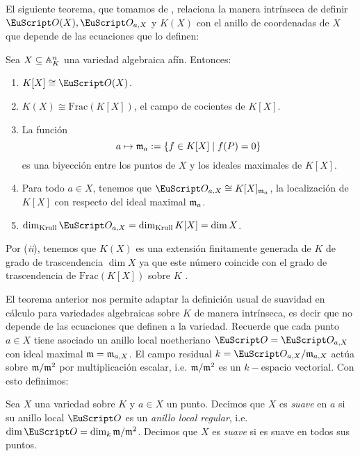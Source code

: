 \documentclass[../../tesis_maestria]{subfiles}
\begin{document}
El siguiente teorema, que tomamos de \cite{HartshorneAG}, relaciona la manera intrínseca de definir $\Oo(X),\Oo_{a,X}$ y $K(X)$ con el anillo de coordenadas de $X$ que depende de las ecuaciones que lo definen:

\begin{thm}\label{thm:prop-coord-X}
	Sea $X\subseteq\mathbb{A}^n_K$ una variedad algebraica afín. Entonces:
	\begin{enumerate}[label=(\roman*)]
		\item $K[X]\cong\Oo(X)$.
		\item $K(X)\cong\mathrm{Frac}(K[X])$, el campo de cocientes de $K[X]$.
		\item La función
		\[
			a \mapsto \mathfrak{m}_a:=\{f\in K[X]\mid f(P)=0\}
		\]
		es una biyección entre los puntos de $X$ y los ideales maximales de $K[X]$.
		\item Para todo $a\in X$, tenemos que $\Oo_{a,X}\cong K[X]_{\m_a}$, la localización de $K[X]$ con respecto del ideal maximal $\mathfrak{m}_a$.
		\item\label{dim-local-ring} $\dim_{\mathrm{Krull}}\Oo_{a,X}=\dim_{\mathrm{Krull}}K[X]=\dim X$.
	\end{enumerate}
\end{thm}

\begin{nota}
	Por (\emph{ii}), tenemos que $K(X)$ es una extensión finitamente generada de $K$ de grado de trascendencia $\dim X$ ya que este número coincide con el grado de trascendencia de $\mathrm{Frac}(K[X])$ sobre $K$ \cite[\S14]{MatsumuraCA}.
\end{nota}

El teorema anterior nos permite adaptar la definición usual de suavidad en cálculo para variedades algebraicas sobre $K$ de manera intrínseca, es decir que no depende de las ecuaciones que definen a la variedad. Recuerde que cada punto $a\in X$ tiene asociado un anillo local noetheriano $\Oo=\Oo_{a,X}$ con ideal maximal $\mathfrak{m}=\mathfrak{m}_{a,X}$. El campo residual $k=\Oo_{a,X}/\m_{a,X}$ actúa sobre $\mathfrak{m}/\mathfrak{m}^2$ por multiplicación escalar, i.e. $\mathfrak{m}/\mathfrak{m}^2$ es un $k-$espacio vectorial. Con esto definimos:

\begin{defin}
	Sea $X$ una variedad sobre $K$ y $a\in X$ un punto. Decimos que $X$ es \emph{suave} en $a$ si su anillo local $\Oo$ es un \emph{anillo local regular}, i.e. $\dim\Oo=\dim_k \m/\m^2$. Decimos que $X$ es \emph{suave} si es suave en todos sus puntos.
\end{defin}
\end{document}
